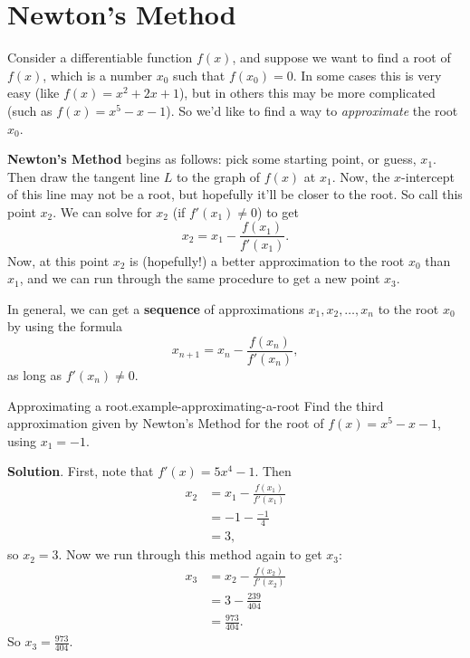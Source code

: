 \documentclass[10pt,]{book}
\newcommand{\terminology}[1]{\textbf{#1}}
\numberwithin{equation}{section}
\begin{document}
\section[{Newton's Method}]{Newton's Method}\label{section-newton-s-method}
\hypertarget{p-366}{}%
Consider a differentiable function \(f(x)\), and suppose we want to find a root of \(f(x)\), which is a number \(x_{0}\) such that \(f(x_{0}) = 0\). In some cases this is very easy (like \(f(x) = x^{2} + 2x + 1\)), but in others this may be more complicated (such as \(f(x) = x^{5} - x  - 1\)). So we'd like to find a way to \emph{approximate} the root \(x_{0}\).%
\par
\hypertarget{p-367}{}%
\terminology{Newton's Method} begins as follows: pick some starting point, or guess, \(x_{1}\). Then draw the tangent line \(L\) to the graph of \(f(x)\) at \(x_{1}\). Now, the \(x\)-intercept of this line may not be a root, but hopefully it'll be closer to the root. So call this point \(x_{2}\). We can solve for \(x_{2}\) (if \(f'(x_{1})\neq0\)) to get%
\begin{equation*}
x_{2} = x_{1} - \frac{f(x_{1})}{f'(x_{1})}.
\end{equation*}
Now, at this point \(x_{2}\) is (hopefully!) a better approximation to the root \(x_{0}\) than \(x_{1}\), and we can run through the same procedure to get a new point \(x_{3}\).%
\par
\hypertarget{p-368}{}%
In general, we can get a \terminology{sequence} of approximations \(x_{1},x_{2},\ldots,x_{n}\) to the root \(x_{0}\) by using the formula%
\begin{equation*}
x_{n+1} = x_{n} - \frac{f(x_{n})}{f'(x_{n})},
\end{equation*}
as long as \(f'(x_{n}) \neq0\).%
\begin{example}{Approximating a root.}{example-approximating-a-root}%
\hypertarget{p-369}{}%
Find the third approximation given by Newton's Method for the root of \(f(x) = x^{5} - x - 1\), using \(x_{1} = -1\).%
\par\smallskip%
\noindent\textbf{Solution}.\hypertarget{solution-81}{}\quad%
\hypertarget{p-370}{}%
First, note that \(f'(x) = 5x^{4} - 1\). Then%
\begin{align*}
x_{2} & = x_{1} - \frac{f(x_{1})}{f'(x_{1})} \\
& = -1 - \frac{-1}{4} \\
& = 3, 
\end{align*}
so \(x_{2} = 3\). Now we run through this method again to get \(x_{3}\):%
\begin{align*}
x_{3} & = x_{2} - \frac{f(x_{2})}{f'(x_{2})} \\
& = 3 - \frac{239}{404} \\
& = \frac{973}{404}. 
\end{align*}
So \(x_{3} = \frac{973}{404}.\)%
\end{example}
\end{document}
